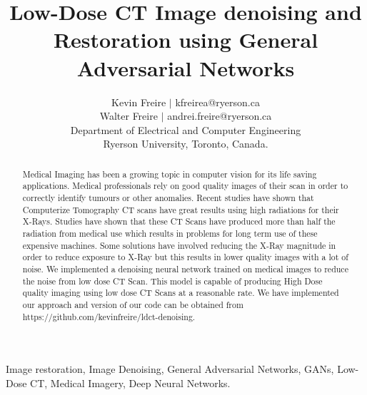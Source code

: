 \documentclass[journal]{IEEEtran}
\begin{document}
\title{Low-Dose CT Image denoising and Restoration using General Adversarial Networks}

\author{Kevin Freire $|$ kfreirea@ryerson.ca\\
Walter Freire $|$ andrei.freire@ryerson.ca \\
Department of Electrical and Computer Engineering\\
Ryerson University, Toronto, Canada.}
\maketitle


\begin{abstract}
Medical Imaging has been a growing topic in computer vision for its life saving applications.  Medical professionals rely on good quality images of their scan in order to correctly identify tumours or other anomalies.  Recent studies have shown that Computerize Tomography CT scans have great results using high radiations for their X-Rays.  Studies have shown that these CT Scans have produced more than half the radiation from medical use which results in problems for long term use of these expensive machines.  Some solutions have involved reducing the X-Ray magnitude in order to reduce exposure to X-Ray but this results in lower quality images with a lot of noise.  We implemented a denoising neural network trained on medical images to reduce the noise from low dose CT Scan.  This model is capable of producing High Dose quality imaging using low dose CT Scans at a reasonable rate.  We have implemented our approach and version of our code can be obtained from https://github.com/kevinfreire/ldct-denoising.
\end{abstract}

\begin{IEEEkeywords}
Image restoration, Image Denoising, General Adversarial Networks, GANs, Low-Dose CT, Medical Imagery, Deep Neural Networks.
\end{IEEEkeywords}

\end{document}
